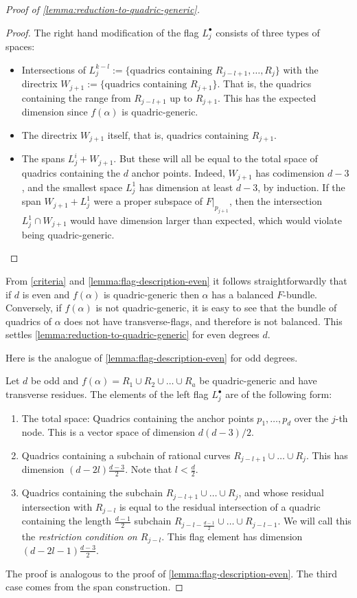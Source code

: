 \documentclass[11pt, two side, letterpaper, final]{amsart}
\begin{document}
\begin{proof}[Proof of \cref{lemma:reduction-to-quadric-generic}]
\begin{proof}
The right hand modification of the flag $L^\bullet_j$ consists of three types of spaces:
\begin{itemize}
	\item Intersections of $L^{k-l}_j :=  \{ \text{quadrics containing } R_{j-l+1},\ldots, R_{j}\}$ with the directrix $W_{j+1} := \{\text{quadrics containing } R_{j+1}\}$. That is, the quadrics containing the range
	from $R_{j-l+1}$ up to $R_{j+1}$. This has the expected dimension since $f(\alpha)$ is quadric-generic.
	\item The directrix $W_{j+1}$ itself, that is, quadrics containing $R_{j+1}$.
	\item The spans $L^i_j+W_{j+1}$. But these will all be equal to the total space
	of quadrics containing the $d$ anchor points. Indeed, $W_{j+1}$ has codimension $d-3$, and the smallest space $L^1_j$
	has dimension at least $d-3$, by induction.
	If the span  $W_{j+1} +L^1_j$ were a proper subspace of $F|_{p_{j+1}}$, then the 
	intersection $L^1_j \cap W_{j+1}$ would have dimension larger than expected, which would violate being 
	quadric-generic.
\end{itemize}
\end{proof}

From \cref{criteria} and  \cref{lemma:flag-description-even} it follows straightforwardly that if $d$ is even and $f(\alpha)$ is quadric-generic 
then $\alpha$ has a balanced $F$-bundle. Conversely, if $f(\alpha)$ is not quadric-generic, it is easy to
see that the bundle of quadrics of $\alpha$ does not have transverse-flags, and therefore is not balanced. This
settles \cref{lemma:reduction-to-quadric-generic} for even degrees $d$.

Here is the analogue of \cref{lemma:flag-description-even} for odd degrees.
\begin{lemma}\label{lemma:flag-description-odd}
Let $d$ be odd and $f(\alpha)=R_1 \cup R_2 \cup \ldots \cup R_a$ be quadric-generic and have transverse residues.
The elements of the left flag $L_j^\bullet$ are of the following form:
\begin{enumerate}
\item The total space: Quadrics containing the anchor points $p_1,\ldots, p_d$ over the
$j$-th node. This is a vector space of dimension $d(d-3)/2$.
\item Quadrics containing a subchain of rational curves
$R_{j-l+1} \cup \ldots \cup R_j$. This has dimension $(d-2l) \frac{d-3}{2}$.
Note that $l< \frac{d}{2}$.
\item Quadrics containing the subchain $R_{j-l+1} \cup \ldots \cup R_j$, and whose
residual intersection with $R_{j-l}$ is equal to the residual intersection of a quadric
containing the length $\frac{d-1}{2}$ subchain
$R_{j-l-\frac{d-1}{2}} \cup \ldots \cup R_{j-l-1}$. We will call this the \emph{restriction condition on $R_{j-l}$}.
This flag element has dimension
$(d-2l-1)\frac{d-3}{2}$.
\end{enumerate}
\end{lemma}
The proof is analogous to the proof of \cref{lemma:flag-description-even}.
The third case comes from the span construction.


\end{proof}
\end{document}

